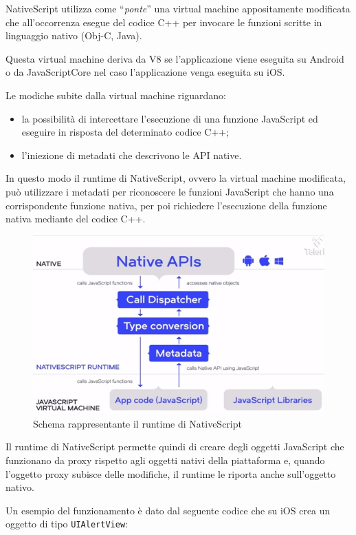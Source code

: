 NativeScript utilizza come ``\textit{ponte}'' una virtual machine appositamente modificata che all'occorrenza esegue del codice C++ per invocare le funzioni scritte in linguaggio nativo (Obj-C, Java).

Questa virtual machine deriva da \gls{V8} se l'applicazione viene eseguita su Android o da \gls{JavaScriptCore} nel caso l'applicazione venga eseguita su iOS.

Le modiche subite dalla virtual machine riguardano:
\begin{itemize}
\item la possibilità di intercettare l'esecuzione di una funzione JavaScript ed eseguire in risposta del determinato codice C++;
\item l'iniezione di metadati che descrivono le API native.
\end{itemize} 
In questo modo il runtime di NativeScript, ovvero la virtual machine modificata, può utilizzare i metadati per riconoscere le funzioni JavaScript che hanno una corrispondente funzione nativa, per poi richiedere l'esecuzione della funzione nativa mediante del codice C++.

\begin{figure}[htp]
\centering
\includegraphics[width=\textwidth*3/4]{../immagini/ns-runtime}
\caption{Schema rappresentante il runtime di NativeScript}  
\end{figure}
\FloatBarrier

Il runtime di NativeScript permette quindi di creare degli oggetti JavaScript che funzionano da \gls{proxy} rispetto agli oggetti nativi della piattaforma e, quando l’oggetto proxy subisce delle modifiche, il runtime le riporta anche sull'oggetto nativo. 

Un esempio del funzionamento è dato dal seguente codice che su iOS crea un oggetto di tipo \texttt{UIAlertView}:

